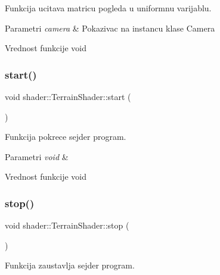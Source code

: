 Funkcija ucitava matricu pogleda u uniformnu varijablu. 


\begin{DoxyParams}{Parametri}
{\em camera} & Pokazivac na instancu klase Camera \\
\hline
\end{DoxyParams}
\begin{DoxyReturn}{Vrednost funkcije}
void 
\end{DoxyReturn}
\mbox{\label{classshader_1_1TerrainShader_a1a198e23fea4d47a75bf7c1c90216d18}} 
\subsubsection{\texorpdfstring{start()}{start()}}
{\footnotesize\ttfamily void shader\+::\+Terrain\+Shader\+::start (\begin{DoxyParamCaption}\item[{void}]{ }\end{DoxyParamCaption})}



Funkcija pokrece sejder program. 


\begin{DoxyParams}{Parametri}
{\em void} & \\
\hline
\end{DoxyParams}
\begin{DoxyReturn}{Vrednost funkcije}
void 
\end{DoxyReturn}
\mbox{\label{classshader_1_1TerrainShader_acee0c1d3730febbd229b5eee94696829}} 
\subsubsection{\texorpdfstring{stop()}{stop()}}
{\footnotesize\ttfamily void shader\+::\+Terrain\+Shader\+::stop (\begin{DoxyParamCaption}\item[{void}]{ }\end{DoxyParamCaption})}



Funkcija zaustavlja sejder program. 


